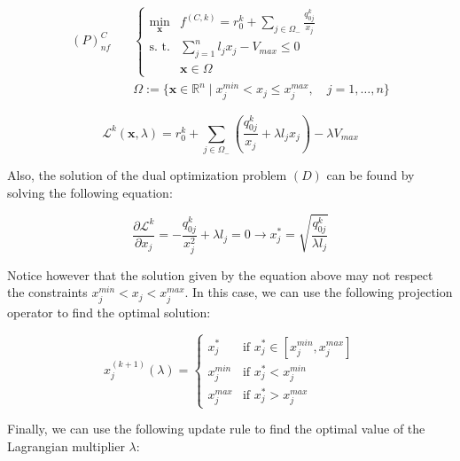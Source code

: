 \begin{equation}
    \begin{aligned}
        (P)_{nf}^C \quad & \begin{cases}
                               \min_{\bm{x}} & f^{(C, k)} = r_0^k + \sum_{j \in \Omega_-} \frac{q_{0j}^k}{x_j} \\
                               \text{s. t.}  & \sum_{j=1}^{n} l_j x_j - V_{max} \leq 0                         \\
                                             & \bm{x} \in \Omega
                           \end{cases} \\
                         & \Omega := \{ \bm{x} \in \mathbb{R}^n \mid x_j^{min} < x_j \le x_j^{max}, \quad j = 1, \dots, n \}
    \end{aligned}
\end{equation}

\begin{equation}
    \mathcal{L}^{k}(\bm{x}, \lambda) = r_0^k + \sum_{j \in \Omega_-} \left(\frac{q_{0j}^k}{x_j} + \lambda l_j x_j \right) - \lambda V_{max}
\end{equation}

Also, the solution of the dual optimization problem $(D)$ can be found by solving the following equation:

\begin{equation}
    \frac{\partial \mathcal{L}^k}{\partial x_j} = - \frac{q_{0j}^k}{x_j^2} + \lambda l_j = 0 \rightarrow x_j^* = \sqrt{\frac{q_{0j}^k}{\lambda l_j}}
\end{equation}

Notice however that the solution given by the equation above may not respect the constraints $x_j^{min} < x_j < x_j^{max}$.
In this case, we can use the following projection operator to find the optimal solution:

\begin{equation}
    x_j^{(k+1)}(\lambda) = \begin{cases}
        x_j^*     & \text{if } x_j^* \in [x_j^{min}, x_j^{max}] \\
        x_j^{min} & \text{if } x_j^* < x_j^{min}                \\
        x_j^{max} & \text{if } x_j^* > x_j^{max}
    \end{cases}
    \label{eq:projection_operator}
\end{equation}

Finally, we can use the following update rule to find the optimal value of the Lagrangian multiplier $\lambda$:

